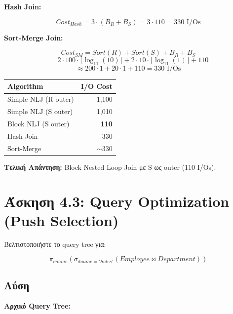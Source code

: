 \textbf{Hash Join:}

$$Cost_{Hash} = 3 \cdot (B_R + B_S) = 3 \cdot 110 = 330 \text{ I/Os}$$

\textbf{Sort-Merge Join:}

$$Cost_{SM} = Sort(R) + Sort(S) + B_R + B_S$$
$$= 2 \cdot 100 \cdot \lceil \log_{11}(10) \rceil + 2 \cdot 10 \cdot \lceil \log_{11}(1) \rceil + 110$$
$$\approx 200 \cdot 1 + 20 \cdot 1 + 110 = 330 \text{ I/Os}$$

\begin{center}
\begin{tabular}{lr}
\toprule
\textbf{Algorithm} & \textbf{I/O Cost} \\
\midrule
Simple NLJ (R outer) & 1,100 \\
Simple NLJ (S outer) & 1,010 \\
Block NLJ (S outer) & \textbf{110} \\
Hash Join & 330 \\
Sort-Merge & $\sim$330 \\
\bottomrule
\end{tabular}
\end{center}

\textbf{Τελική Απάντηση:} Block Nested Loop Join με S ως outer (110 I/Os).

\section{Άσκηση 4.3: Query Optimization (Push Selection)}

\begin{formulabox}[Εκφώνηση]
Βελτιστοποιήστε το query tree για:

$$\pi_{ename}(\sigma_{dname='Sales'}(Employee \bowtie Department))$$
\end{formulabox}

\subsection*{Λύση}

\textbf{Αρχικό Query Tree:}

